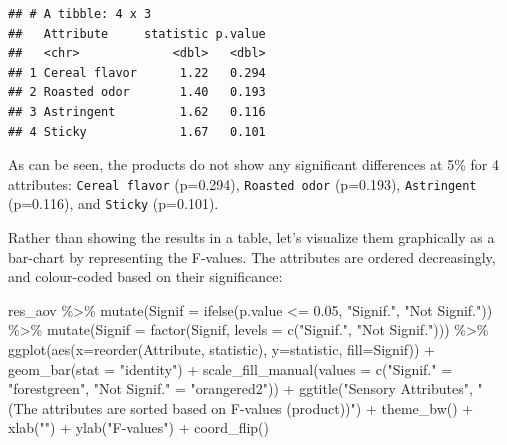 \documentclass[
]{krantz}
\makeatletter
\newenvironment{Shaded}{\begin{snugshade}}{\end{snugshade}}
\newcommand{\AttributeTok}[1]{\textcolor[rgb]{0.61,0.61,0.61}{#1}}
\newcommand{\FloatTok}[1]{\textcolor[rgb]{0.06,0.06,0.06}{#1}}
\newcommand{\FunctionTok}[1]{\textcolor[rgb]{0,0,0}{#1}}
\newcommand{\NormalTok}[1]{#1}
\newcommand{\OtherTok}[1]{\textcolor[rgb]{0.37,0.37,0.37}{#1}}
\newcommand{\SpecialCharTok}[1]{\textcolor[rgb]{0,0,0}{#1}}
\newcommand{\StringTok}[1]{\textcolor[rgb]{0.5,0.5,0.5}{#1}}
\newenvironment{kframe}{%
\medskip{}
\setlength{\fboxsep}{.8em}
 \def\at@end@of@kframe{}%
 \ifinner\ifhmode%
  \def\at@end@of@kframe{\end{minipage}}%
  \begin{minipage}{\columnwidth}%
 \fi\fi%
 \def\FrameCommand##1{\hskip\@totalleftmargin \hskip-\fboxsep
 \colorbox{shadecolor}{##1}\hskip-\fboxsep
     \hskip-\linewidth \hskip-\@totalleftmargin \hskip\columnwidth}%
 \MakeFramed {\advance\hsize-\width
   \@totalleftmargin\z@ \linewidth\hsize
   \@setminipage}}%
 {\par\unskip\endMakeFramed%
 \at@end@of@kframe}
\renewenvironment{Shaded}{\begin{kframe}}{\end{kframe}}
\makeatother
\begin{document}
\begin{verbatim}
## # A tibble: 4 x 3
##   Attribute     statistic p.value
##   <chr>             <dbl>   <dbl>
## 1 Cereal flavor      1.22   0.294
## 2 Roasted odor       1.40   0.193
## 3 Astringent         1.62   0.116
## 4 Sticky             1.67   0.101
\end{verbatim}

As can be seen, the products do not show any significant differences at 5\% for 4 attributes: \texttt{Cereal\ flavor} (p=0.294), \texttt{Roasted\ odor} (p=0.193), \texttt{Astringent} (p=0.116), and \texttt{Sticky} (p=0.101).

Rather than showing the results in a table, let's visualize them graphically as a bar-chart by representing the F-values. The attributes are ordered decreasingly, and colour-coded based on their significance:

\begin{Shaded}
\begin{Highlighting}[]
\NormalTok{res\_aov }\SpecialCharTok{\%\textgreater{}\%}
  \FunctionTok{mutate}\NormalTok{(}\AttributeTok{Signif =} \FunctionTok{ifelse}\NormalTok{(p.value }\SpecialCharTok{\textless{}=} \FloatTok{0.05}\NormalTok{, }\StringTok{"Signif."}\NormalTok{, }\StringTok{"Not Signif."}\NormalTok{)) }\SpecialCharTok{\%\textgreater{}\%}
  \FunctionTok{mutate}\NormalTok{(}\AttributeTok{Signif =} \FunctionTok{factor}\NormalTok{(Signif, }
                         \AttributeTok{levels =} \FunctionTok{c}\NormalTok{(}\StringTok{"Signif."}\NormalTok{, }\StringTok{"Not Signif."}\NormalTok{))) }\SpecialCharTok{\%\textgreater{}\%}
  \FunctionTok{ggplot}\NormalTok{(}\FunctionTok{aes}\NormalTok{(}\AttributeTok{x=}\FunctionTok{reorder}\NormalTok{(Attribute, statistic), }\AttributeTok{y=}\NormalTok{statistic, }
             \AttributeTok{fill=}\NormalTok{Signif)) }\SpecialCharTok{+}
  \FunctionTok{geom\_bar}\NormalTok{(}\AttributeTok{stat =} \StringTok{"identity"}\NormalTok{) }\SpecialCharTok{+}
  \FunctionTok{scale\_fill\_manual}\NormalTok{(}\AttributeTok{values =} \FunctionTok{c}\NormalTok{(}\StringTok{"Signif."} \OtherTok{=} \StringTok{"forestgreen"}\NormalTok{, }
                               \StringTok{"Not Signif."} \OtherTok{=} \StringTok{"orangered2"}\NormalTok{)) }\SpecialCharTok{+}
  \FunctionTok{ggtitle}\NormalTok{(}\StringTok{"Sensory Attributes"}\NormalTok{, }
          \StringTok{"(The attributes are sorted based on F{-}values (product))"}\NormalTok{) }\SpecialCharTok{+}
  \FunctionTok{theme\_bw}\NormalTok{() }\SpecialCharTok{+}
  \FunctionTok{xlab}\NormalTok{(}\StringTok{""}\NormalTok{) }\SpecialCharTok{+}
  \FunctionTok{ylab}\NormalTok{(}\StringTok{"F{-}values"}\NormalTok{) }\SpecialCharTok{+}
  \FunctionTok{coord\_flip}\NormalTok{()}
\end{Highlighting}
\end{Shaded}
\end{document}
